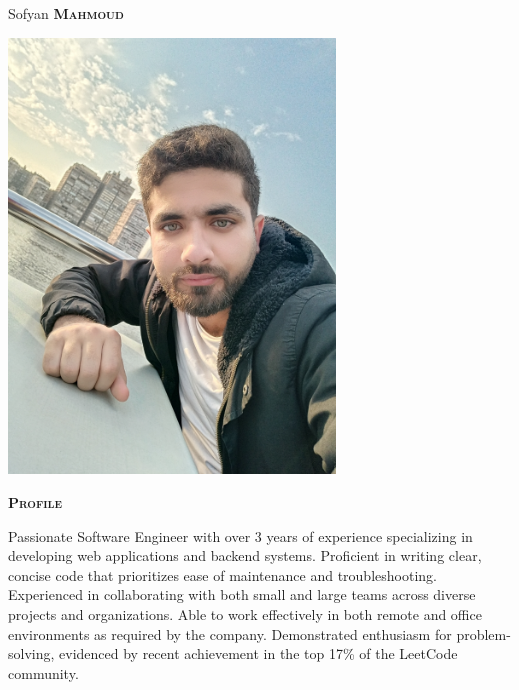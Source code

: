 \documentclass[11pt, a4paper]{article}
\newcommand{\headleft}[1]{\vspace*{3ex}\textsc{\textbf{#1}}\par%
    \vspace*{-1.5ex}\hrulefill\par\vspace*{0.7ex}}
\begin{document}
\setlength{\topskip}{0pt}
\setlength{\parindent}{0pt}
\setlength{\parskip}{0pt}
\setlength{\fboxsep}{0pt}
\pagestyle{empty}
\raggedbottom

\begin{minipage}[t]{0.33\textwidth} %
\colorbox{secondColor}{\begin{minipage}[t][5mm][t]{\textwidth}\null\hfill\null\end{minipage}}

\vspace{-.2ex} %
\colorbox{secondColor!90}{\color{white}  %
\textwidth\relax%
\begin{minipage}[t][293mm][t]{0.82\textwidth}
\raggedright
\vspace*{2.5ex}

\Large \centerline{Sofyan \textbf{\textsc{Mahmoud}}} \normalsize 

\null\hfill\includegraphics[width=0.65\textwidth]{avatar.jpeg}\hfill\null

\vspace*{0.5ex} %

\headleft{Profile}
Passionate Software Engineer with over 3 years of experience specializing in developing web applications and backend systems. 
Proficient in writing clear, concise code that prioritizes ease of maintenance and troubleshooting. 
Experienced in collaborating with both small and large teams across diverse projects and organizations. 
Able to work effectively in both remote and office environments as required by the company. 
Demonstrated enthusiasm for problem-solving, evidenced by recent achievement in the top 17\% of the LeetCode community.


\end{minipage}}
\end{minipage}
\end{document}
